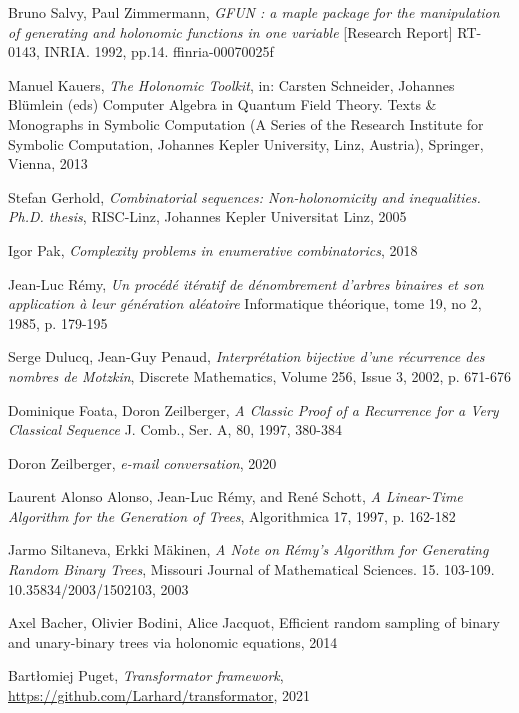 \documentclass[final]{article}
\theoremstyle{definition}
\theoremstyle{remark}
\begin{document}
\begin{thebibliography}{9}
    Bruno Salvy, Paul Zimmermann,
    \textit{GFUN : a maple package for the manipulation of generating and holonomic functions in one variable}
    [Research Report] RT-0143, INRIA. 1992, pp.14. ffinria-00070025f

    Manuel Kauers,
    \textit{The Holonomic Toolkit},
    in: Carsten Schneider, Johannes Blümlein (eds) Computer Algebra in Quantum Field Theory. Texts \& Monographs in Symbolic Computation (A Series of the Research Institute for Symbolic Computation, Johannes Kepler University, Linz, Austria),
    Springer, Vienna,
    2013

    Stefan Gerhold,
    \textit{Combinatorial sequences: Non-holonomicity and inequalities. Ph.D. thesis},
    RISC-Linz, Johannes Kepler Universitat Linz,
    2005

    Igor Pak,
    \textit{Complexity problems in enumerative combinatorics},
    2018

    Jean-Luc Rémy,
    \textit{Un procédé itératif de dénombrement d’arbres binaires et son application à leur génération aléatoire}
    Informatique théorique, tome 19, no 2, 
    1985,
    p. 179-195

    Serge Dulucq, Jean-Guy Penaud,
    \textit{Interprétation bijective d'une récurrence des nombres de Motzkin},
    Discrete Mathematics,
    Volume 256, Issue 3,
    2002,
    p. 671-676

    Dominique Foata, Doron Zeilberger,
    \textit{A Classic Proof of a Recurrence for a Very Classical Sequence}
    J. Comb., Ser. A, 80,
    1997, 380-384

    Doron Zeilberger,
    \textit{e-mail conversation},
    2020


    Laurent Alonso Alonso, Jean-Luc Rémy, and René Schott,
    \textit{A Linear-Time Algorithm for the Generation of Trees},
    Algorithmica 17,
    1997,
    p. 162-182

    Jarmo Siltaneva, Erkki Mäkinen,
    \textit{A Note on Rémy's Algorithm for Generating Random Binary Trees},
    Missouri Journal of Mathematical Sciences. 15. 103-109. 10.35834/2003/1502103,
    2003 

    Axel Bacher, Olivier Bodini, Alice Jacquot,
    Efficient random sampling of binary and unary-binary trees via holonomic equations,
    2014


    Bartłomiej Puget,
    \textit{Transformator framework},
    \url{https://github.com/Larhard/transformator},
    2021

\end{thebibliography}
\end{document}
